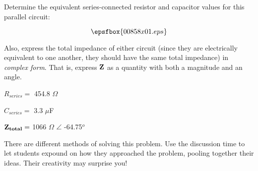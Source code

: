 

Determine the equivalent series-connected resistor and capacitor values for this parallel circuit:

$$\epsfbox{00858x01.eps}$$

Also, express the total impedance of either circuit (since they are electrically equivalent to one another, they should have the same total impedance) in {\it complex form}.  That is, express ${\bf Z}$ as a quantity with both a magnitude and an angle.







$R_{series} =$ 454.8 $\Omega$

\vskip 10pt

$C_{series} =$ 3.3 $\mu$F

\vskip 10pt

${\bf Z_{total}} =$ 1066 $\Omega$ $\angle$ -64.75$^{o}$







There are different methods of solving this problem.  Use the discussion time to let students expound on how they approached the problem, pooling together their ideas.  Their creativity may surprise you!





